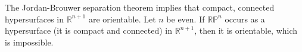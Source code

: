 \documentclass[11pt,leqno]{article}
\theoremstyle{plain}
\theoremstyle{definition}
\numberwithin{equation}{section}
\numberwithin{lem}{section}
\begin{document}
\begin{enumerate}
    The Jordan-Brouwer separation theorem implies that compact, connected hypersurfaces in $\mathbb R^{n+1}$ are orientable. Let $n$ be even. If $\mathbb {RP}^{n}$ occurs as a hypersurface (it is compact and connected) in $\mathbb R^{n+1}$, then it is orientable, which is impossible.
\end{enumerate}
\end{document}
